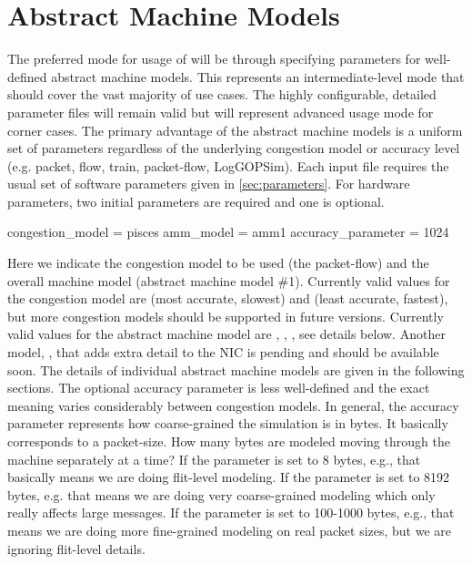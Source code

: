 
\section{Abstract Machine Models}
\label{sec:amm}

The preferred mode for usage of \sstmacro will be through specifying parameters for well-defined abstract machine models.
This represents an intermediate-level mode that should cover the vast majority of use cases.
The highly configurable, detailed parameter files will remain valid but will represent advanced usage mode for corner cases.
The primary advantage of the abstract machine models is a uniform set of parameters regardless of the underlying congestion model or accuracy level (e.g. packet, flow, train, packet-flow, LogGOPSim).
Each input file requires the usual set of software parameters given in \ref{sec:parameters}.
For hardware parameters, two initial parameters are required and one is optional.

\begin{ViFile}
congestion_model = pisces
amm_model = amm1
accuracy_parameter = 1024
\end{ViFile} 

Here we indicate the congestion model to be used (the packet-flow) and the overall machine model (abstract machine model \#1).
Currently valid values for the congestion model are  (most accurate, slowest) and  (least accurate, fastest),
but more congestion models should be supported in future versions.
Currently valid values for the abstract machine model are , , , see details below. 
Another model, , that adds extra detail to the NIC is pending and should be available soon.
The details of individual abstract machine models are given in the following sections.
The optional accuracy parameter is less well-defined and the exact meaning varies considerably between congestion models.
In general, the accuracy parameter represents how coarse-grained the simulation is in bytes.
It basically corresponds to a packet-size. How many bytes are modeled moving through the machine separately at a time?
If the parameter is set to 8 bytes, e.g., that basically means we are doing flit-level modeling.
If the parameter is set to 8192 bytes, e.g. that means we are doing very coarse-grained modeling which only really affects large messages.
If the parameter is set to 100-1000 bytes, e.g., that means we are doing more fine-grained modeling on real packet sizes, but we are ignoring flit-level details.

